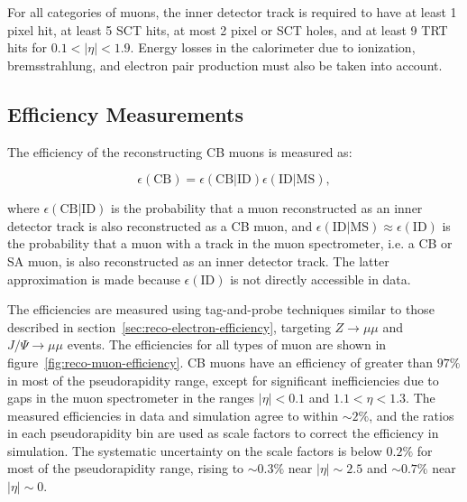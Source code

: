 For all categories of muons, the inner detector track is required to have at least 1 pixel hit, at least 5 SCT hits, at most 2 pixel or SCT holes, and at least 9 TRT hits for $0.1<|\eta|<1.9$. Energy losses in the calorimeter due to ionization, bremsstrahlung, and electron pair production must also be taken into account. 

\subsection{Efficiency Measurements}\label{sec:reco-muon-efficiency}
The efficiency of the reconstructing CB muons is measured as:

\begin{equation}
	\epsilon(\mathrm{CB}) = \epsilon(\mathrm{CB}|\mathrm{ID}) \epsilon(\mathrm{ID}|\mathrm{MS}),
\end{equation}

where $\epsilon(\mathrm{CB}|\mathrm{ID})$ is the probability that a muon reconstructed as an inner detector track is also reconstructed as a CB muon, and $\epsilon(\mathrm{ID}|\mathrm{MS})\approx \epsilon(\mathrm{ID})$ is the probability that a muon with a track in the muon spectrometer, i.e. a CB or SA muon, is also reconstructed as an inner detector track. The latter approximation is made because $\epsilon(\mathrm{ID})$ is not directly accessible in data. 

The efficiencies are measured using tag-and-probe techniques similar to those described in section~\ref{sec:reco-electron-efficiency}, targeting $Z\rightarrow\mu\mu$ and $J/\Psi\rightarrow\mu\mu$ events. The efficiencies for all types of muon are shown in figure~\ref{fig:reco-muon-efficiency}. CB muons have an efficiency of greater than $97\%$ in most of the pseudorapidity range, except for significant inefficiencies due to gaps in the muon spectrometer in the ranges $|\eta|<0.1$ and $1.1<\eta<1.3$. The measured efficiencies in data and simulation agree to within $\sim2\%$, and the ratios in each pseudorapidity bin are used as scale factors to correct the efficiency in simulation. The systematic uncertainty on the scale factors is below $0.2\%$ for most of the pseudorapidity range, rising to $\sim 0.3\%$ near $|\eta|\sim 2.5$ and $\sim0.7\%$ near $|\eta|\sim 0$. 

